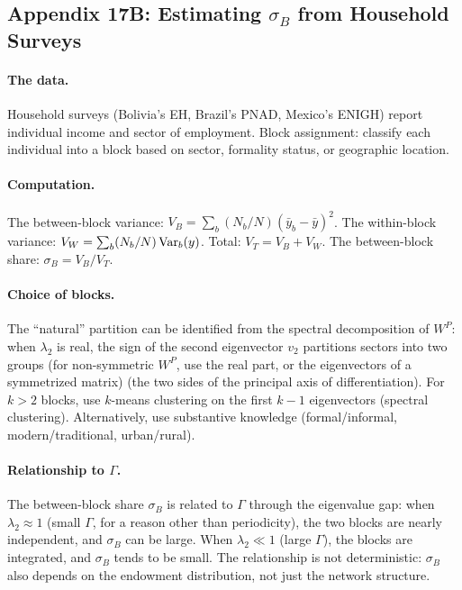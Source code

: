 \documentclass[../structural_economics_book.tex]{subfiles}
\begin{document}
\subsection*{Appendix 17B: Estimating $\sigma_B$ from Household Surveys}
\label{ch17:app:sigma}

\paragraph{The data.} Household surveys (Bolivia's EH, Brazil's PNAD, Mexico's ENIGH) report individual income and sector of employment. Block assignment: classify each individual into a block based on sector, formality status, or geographic location.

\paragraph{Computation.} The between-block variance: $V_B = \sum_b (N_b/N)(\bar{y}_b - \bar{y})^2$. The within-block variance: $V_W = \sum_b (N_b/N)\operatorname{Var}_b(y)$. Total: $V_T = V_B + V_W$. The between-block share: $\sigma_B = V_B/V_T$.

\paragraph{Choice of blocks.} The ``natural'' partition can be identified from the spectral decomposition of $W^P$: when $\lambda_2$ is real, the sign of the second eigenvector $v_2$ partitions sectors into two groups (for non-symmetric $W^P$, use the real part, or the eigenvectors of a symmetrized matrix) (the two sides of the principal axis of differentiation). For $k > 2$ blocks, use $k$-means clustering on the first $k-1$ eigenvectors (spectral clustering). Alternatively, use substantive knowledge (formal/informal, modern/traditional, urban/rural).

\paragraph{Relationship to $\Gamma$.} The between-block share $\sigma_B$ is related to $\Gamma$ through the eigenvalue gap: when $\lambda_2 \approx 1$ (small $\Gamma$, for a reason other than periodicity), the two blocks are nearly independent, and $\sigma_B$ can be large. When $\lambda_2 \ll 1$ (large $\Gamma$), the blocks are integrated, and $\sigma_B$ tends to be small. The relationship is not deterministic: $\sigma_B$ also depends on the endowment distribution, not just the network structure.
\end{document}
